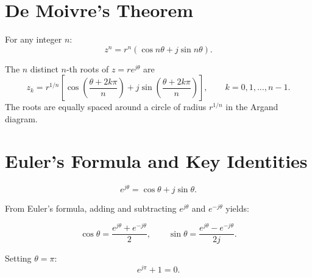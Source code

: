 \section{De Moivre's Theorem}

\begin{theorem}
For any integer $n$:
\[
  z^n = r^n(\cos n\theta + j\sin n\theta).
\]
\end{theorem}

\begin{theorem}[$n$-th Roots]
The $n$ distinct $n$-th roots of $z = re^{j\theta}$ are
\[
  z_k = r^{1/n}\left[\cos\!\left(\frac{\theta + 2k\pi}{n}\right)
                    + j\sin\!\left(\frac{\theta + 2k\pi}{n}\right)\right],
  \qquad k = 0, 1, \ldots, n-1.
\]
The roots are equally spaced around a circle of radius $r^{1/n}$ in the Argand diagram.
\end{theorem}

\section{Euler's Formula and Key Identities}
\label{sec:euler}

\begin{theorem}
\[
  e^{j\theta} = \cos\theta + j\sin\theta.
\]
\end{theorem}

From Euler's formula, adding and subtracting $e^{j\theta}$ and $e^{-j\theta}$ yields:

\begin{corollary}
\[
  \cos\theta = \frac{e^{j\theta} + e^{-j\theta}}{2}, \qquad
  \sin\theta = \frac{e^{j\theta} - e^{-j\theta}}{2j}.
\]
\end{corollary}

\begin{example}
Setting $\theta = \pi$:
\[
  e^{j\pi} + 1 = 0.
\]
\end{example}
